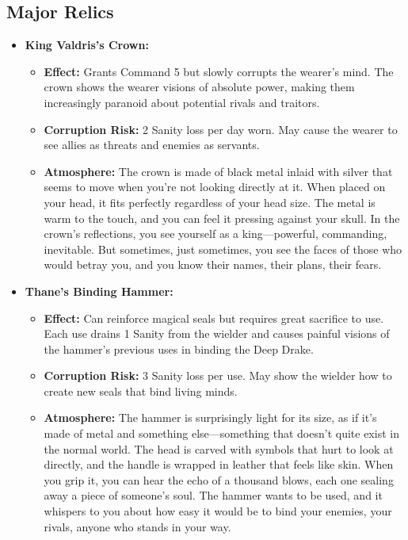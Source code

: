 \documentclass[11pt]{article}
\begin{document}
\begin{itemize}
\subsection{Major Relics}
\begin{itemize}
\item \textbf{King Valdris's Crown:} 
  \begin{itemize}
  \item \textbf{Effect:} Grants Command 5 but slowly corrupts the wearer's mind. The crown shows the wearer visions of absolute power, making them increasingly paranoid about potential rivals and traitors.
  \item \textbf{Corruption Risk:} 2 Sanity loss per day worn. May cause the wearer to see allies as threats and enemies as servants.
  \item \textbf{Atmosphere:} The crown is made of black metal inlaid with silver that seems to move when you're not looking directly at it. When placed on your head, it fits perfectly regardless of your head size. The metal is warm to the touch, and you can feel it pressing against your skull. In the crown's reflections, you see yourself as a king—powerful, commanding, inevitable. But sometimes, just sometimes, you see the faces of those who would betray you, and you know their names, their plans, their fears.
  \end{itemize}
\item \textbf{Thane's Binding Hammer:} 
  \begin{itemize}
  \item \textbf{Effect:} Can reinforce magical seals but requires great sacrifice to use. Each use drains 1 Sanity from the wielder and causes painful visions of the hammer's previous uses in binding the Deep Drake.
  \item \textbf{Corruption Risk:} 3 Sanity loss per use. May show the wielder how to create new seals that bind living minds.
  \item \textbf{Atmosphere:} The hammer is surprisingly light for its size, as if it's made of metal and something else—something that doesn't quite exist in the normal world. The head is carved with symbols that hurt to look at directly, and the handle is wrapped in leather that feels like skin. When you grip it, you can hear the echo of a thousand blows, each one sealing away a piece of someone's soul. The hammer wants to be used, and it whispers to you about how easy it would be to bind your enemies, your rivals, anyone who stands in your way.
  \end{itemize}

\end{itemize}
\end{itemize}
\end{document}
